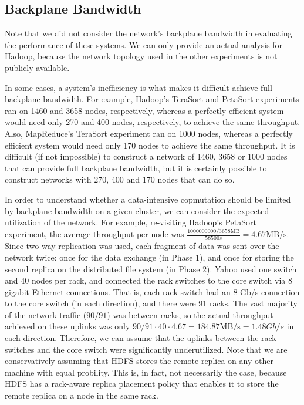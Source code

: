 \documentclass[ 11pt, letterpaper]{article}%
\begin{document}
\subsection{Backplane Bandwidth}\label{sec:backplane}

Note that we did not consider the network's backplane bandwidth in evaluating
the performance of these systems. We can only provide an actual analysis for
Hadoop, because the network topology used in the other experiments is not
publicly available.

In some cases, a system's inefficiency is what makes it difficult achieve full
backplane bandwidth. For example, Hadoop's TeraSort and PetaSort experiments ran
on 1460 and 3658 nodes, respectively, whereas a perfectly efficient system would
need only 270 and 400 nodes, respectively, to achieve the same throughput. Also,
MapReduce's TeraSort experiment ran on 1000 nodes, whereas a perfectly efficient system would need only 170 nodes to achieve the same throughput. It is difficult (if not
impossible) to construct a network of 1460, 3658 or 1000 nodes that can provide
full backplane bandwidth, but it is certainly possible to construct networks
with 270, 400 and 170 nodes that can do so.

In order to understand whether a data-intensive copmutation should be
limited by backplane bandwidth on a given cluster, we can consider the expected
utilization of the network. For example, re-visiting Hadoop's PetaSort
experiment, the average throughput per node was $\frac{1000000000/3658 \text{MB}}{58500 s} = 4.67 \text{MB/s}$. Since two-way replication was used, each fragment of data was sent over the network twice: once for the data exchange (in Phase 1), and once for storing the second replica on the distributed file system (in Phase 2). Yahoo used one switch and 40 nodes per rack, and connected the rack switches to the core switch via 8 gigabit Ethernet connections. That is, each rack switch had an 8 Gb/s connection to the core
switch (in each direction), and there were 91 racks. The vast
majority of the network traffic ($90/91$) was between racks, so the actual throughput achieved
on these uplinks was only $90/91 \cdot 40 \cdot 4.67 = 184.87 \text{MB/s} =
1.48 Gb/s$ in each direction. Therefore, we can assume that the uplinks between
the rack switches and the core switch were significantly underutilized. Note
that we are conservatively assuming that HDFS stores the remote replica on
any other machine with equal probility. This is, in fact, not necessarily the
case, because HDFS has a rack-aware replica placement policy that enables it to
store the remote replica on a node in the same rack.
\end{document}
